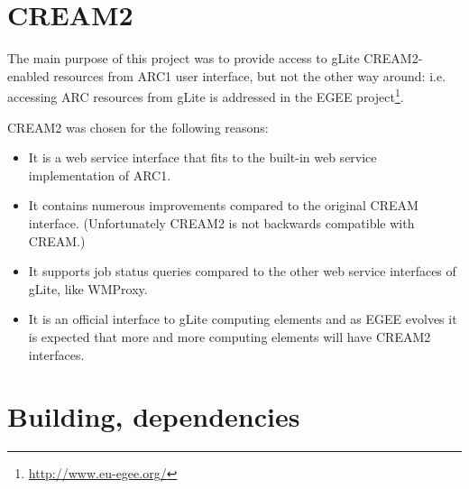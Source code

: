 \documentclass{article}
\begin{document}
\section{CREAM2}
The main purpose of this project was to provide access to gLite CREAM2-enabled resources from ARC1 user interface, but not the other way around: i.e. accessing ARC resources from gLite is addressed in the EGEE project\footnote{\url{http://www.eu-egee.org/}}.\par
CREAM2 was chosen for the following reasons:
\begin{itemize}
\item It is a web service interface that fits to the built-in web service implementation of ARC1.
\item It contains numerous improvements compared to the original CREAM interface. (Unfortunately CREAM2 is not backwards compatible with CREAM.)
\item It supports job status queries compared to the other web service interfaces of gLite, like WMProxy.
\item It is an official interface to gLite computing elements and as EGEE evolves it is expected that more and more computing elements will have CREAM2 interfaces.
\end{itemize}
\section{Building, dependencies}
\end{document}
